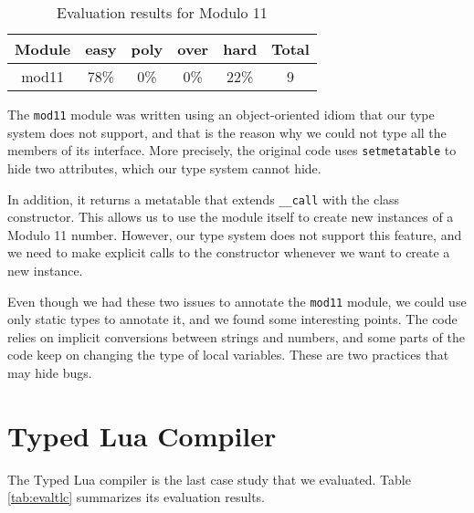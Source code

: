 \begin{table}[!ht]
\begin{center}
\begin{tabular}{|c|c|c|c|c|c|}
\hline
\textbf{Module} & \textbf{easy} & \textbf{poly} & \textbf{over} & \textbf{hard} & \textbf{Total} \\
\hline
mod11 & 78\% & 0\% & 0\% & 22\% & 9 \\ %
\hline
\end{tabular}
\end{center}
\caption{Evaluation results for Modulo 11}
\label{tab:evalmod11}
\end{table}

The \texttt{mod11} module was written using an object-oriented idiom that
our type system does not support, and that is the reason why we could not
type all the members of its interface.
More precisely, the original code uses \texttt{setmetatable} to hide
two attributes, which our type system cannot hide.

In addition, it returns a metatable that extends \texttt{\string_\string_call}
with the class constructor.
This allows us to use the module itself to create new instances of a
Modulo 11 number.
However, our type system does not support this feature, and we need to
make explicit calls to the constructor whenever we want to create a
new instance.

Even though we had these two issues to annotate the \texttt{mod11} module,
we could use only static types to annotate it, and we found some interesting
points.
The code relies on implicit conversions between strings and numbers,
and some parts of the code keep on changing the type of local variables.
These are two practices that may hide bugs.

\section{Typed Lua Compiler}

The Typed Lua compiler is the last case study that we evaluated.
Table \ref{tab:evaltlc} summarizes its evaluation results.

